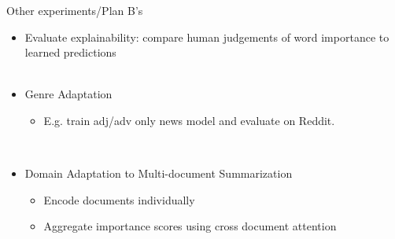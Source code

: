 \begin{frame}{Other experiments/Plan B's}

    \begin{itemize}
        \item Evaluate explainability: compare human judgements of word 
            importance to learned predictions
            ~\\~\\
        \item Genre Adaptation
            \begin{itemize}
                \item E.g. train adj/adv only news model and evaluate on Reddit.
            \end{itemize} ~\\
            \item Domain Adaptation to Multi-document Summarization
                \begin{itemize}
                    \item Encode documents individually
                    \item Aggregate importance scores using cross document attention
                \end{itemize}
    \end{itemize}
\end{frame}





